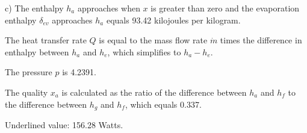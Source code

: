 c) The enthalpy \( h_a \) approaches when \( x \) is greater than zero and the evaporation enthalpy \( \delta_{ev} \) approaches \( h_a \) equals 93.42 kilojoules per kilogram.

The heat transfer rate \( Q \) is equal to the mass flow rate \( \dot{m} \) times the difference in enthalpy between \( h_a \) and \( h_e \), which simplifies to \( h_a - h_e \).

The pressure \( p \) is 4.2391.

The quality \( x_a \) is calculated as the ratio of the difference between \( h_a \) and \( h_f \) to the difference between \( h_g \) and \( h_f \), which equals 0.337.

Underlined value: 156.28 Watts.